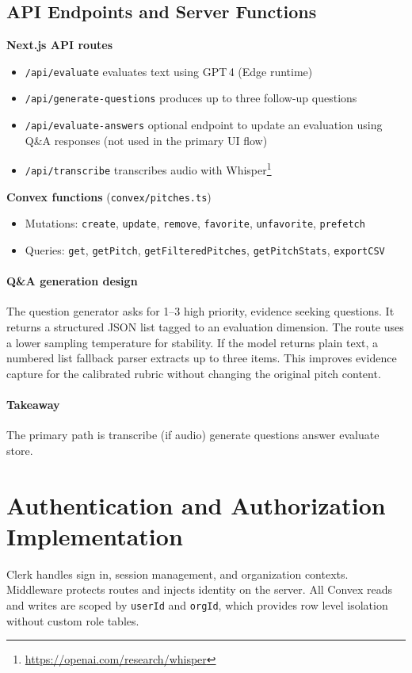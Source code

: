 \subsection{API Endpoints and Server Functions}\label{subsec:api-and-server}
\textbf{Next.js API routes}
\begin{itemize}
  \item \texttt{/api/evaluate} evaluates text using GPT\,4 (Edge runtime)
  \item \texttt{/api/generate-questions} produces up to three follow\mbox{-}up questions
  \item \texttt{/api/evaluate-answers} optional endpoint to update an evaluation using Q\&A responses (not used in the primary UI flow)
  \item \texttt{/api/transcribe} transcribes audio with Whisper\footnote{\url{https://openai.com/research/whisper}}
\end{itemize}

\textbf{Convex functions} (\texttt{convex/pitches.ts})
\begin{itemize}
  \item Mutations: \texttt{create}, \texttt{update}, \texttt{remove}, \texttt{favorite}, \texttt{unfavorite}, \texttt{prefetch}
  \item Queries: \texttt{get}, \texttt{getPitch}, \texttt{getFilteredPitches}, \texttt{getPitchStats}, \texttt{exportCSV}
\end{itemize}

\paragraph{Q\&A generation design} The question generator asks for 1--3 high priority, evidence seeking questions. It returns a structured JSON list tagged to an evaluation dimension. The route uses a lower sampling temperature for stability. If the model returns plain text, a numbered list fallback parser extracts up to three items. This improves evidence capture for the calibrated rubric without changing the original pitch content.

\paragraph{Takeaway} The primary path is transcribe (if audio) \textrightarrow{} generate questions \textrightarrow{} answer \textrightarrow{} evaluate \textrightarrow{} store.

\section{Authentication and Authorization Implementation}
Clerk handles sign in, session management, and organization contexts. Middleware protects routes and injects identity on the server. All Convex reads and writes are scoped by \texttt{userId} and \texttt{orgId}, which provides row level isolation without custom role tables.

